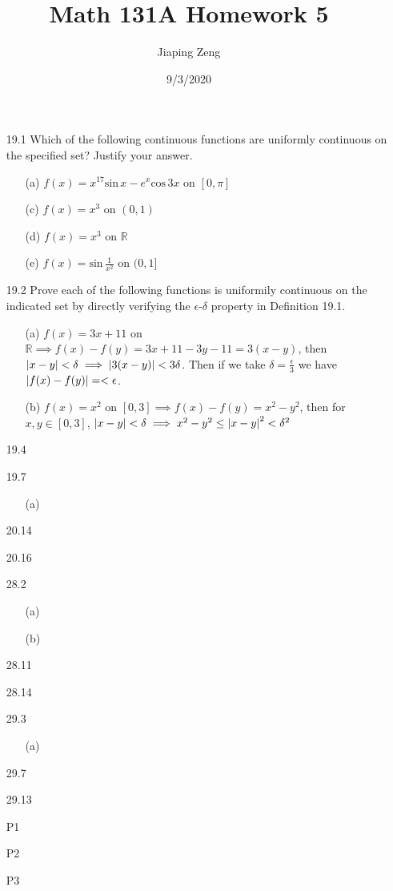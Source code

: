 \documentclass{article}
\title{Math 131A Homework 5}
\date{9/3/2020}
\author{Jiaping Zeng}
\begin{document}
\maketitle

\begin{itemize}
    \item [19.1] Which of the following continuous functions are uniformly continuous on the specified set? Justify your answer.
          \begin{itemize}
              \item [(a)] $f(x)=x^{17}\text{sin}\,x-e^x\text{cos}\,3x$ on $[0,\pi]$
              \item [(c)] $f(x)=x^3$ on $(0,1)$
              \item [(d)] $f(x)=x^3$ on $\mathbb{R}$
              \item [(e)] $f(x)=\text{sin}\,\frac{1}{x^2}$ on $(0,1]$
          \end{itemize}
    \item [19.2] Prove each of the following functions is uniformily continuous on the indicated set by directly verifying the $\epsilon$-$\delta$ property in Definition 19.1.
          \begin{itemize}
              \item [(a)] $f(x)=3x+11$ on $\mathbb{R}\implies f(x)-f(y)=3x+11-3y-11=3(x-y)$, then $\abs{x-y}<\delta\implies\abs{3(x-y)}<3\delta$. Then if we take $\delta=\frac{\epsilon}{3}$ we have $\abs{f(x)-f(y)}=<\epsilon$.
              \item [(b)] $f(x)=x^2$ on $[0,3]\implies f(x)-f(y)=x^2-y^2$, then for $x,y\in[0,3]$, $\abs{x-y}<\delta\implies x^2-y^2\leq\abs{x-y}^2<\delta^2$
          \end{itemize}
    \item [19.4]
    \item [19.7]
          \begin{itemize}
              \item [(a)]
          \end{itemize}
    \item [20.14]
    \item [20.16]
    \item [28.2]
          \begin{itemize}
              \item [(a)]
              \item [(b)]
          \end{itemize}
    \item [28.11]
    \item [28.14]
    \item [29.3]
          \begin{itemize}
              \item [(a)]
          \end{itemize}
    \item [29.7]
    \item [29.13]
    \item [P1]
    \item [P2]
    \item [P3]
\end{itemize}
\end{document}
